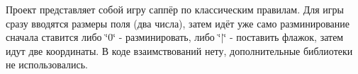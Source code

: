 Проект представляет собой игру саппёр по классическим правилам. Для игры сразу вводятся размеры поля (два числа), затем идёт уже само разминирование сначала ставится либо \char`\"{}0\char`\"{} -\/ разминировать, либо \char`\"{}$\vert$\char`\"{} -\/ поставить флажок, затем идут две координаты. В коде взаимствований нету, дополнительные библиотеки не использовались. 